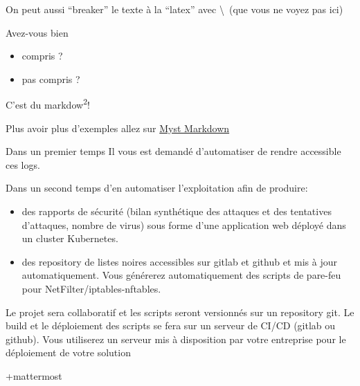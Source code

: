 \documentclass{article}
\begin{document}
On peut aussi \newline
``breaker'' le texte \newline
à la ``latex''
avec {\textbackslash}~(que vous ne voyez pas ici)

Avez-vous bien

\begin{itemize}
\item compris ?
\item pas compris ?
\end{itemize}

C'est du markdow\textsuperscript{2}!

Plus avoir plus d'exemples allez sur \href{https://myst-parser.readthedocs.io/en/latest/}{Myst Markdown}

Dans un premier temps Il vous est demandé d'automatiser de rendre accessible ces logs.

Dans un second temps d'en automatiser l'exploitation afin de produire:

\begin{itemize}
\item des rapports de sécurité (bilan synthétique des attaques et des tentatives d'attaques, nombre de virus) sous forme d'une application web déployé dans un cluster Kubernetes.
\item des repository de listes noires accessibles sur gitlab et github et mis à jour automatiquement.  Vous générerez automatiquement des scripts de pare-feu pour NetFilter/iptables-nftables.
\end{itemize}

Le projet sera collaboratif  et les scripts seront versionnés sur un repository git. Le build et le déploiement des scripts se fera sur un serveur de CI/CD (gitlab ou github).
Vous utiliserez un serveur mis à disposition par votre entreprise pour le déploiement de votre solution

+mattermost
\printglossaries
\end{document}

